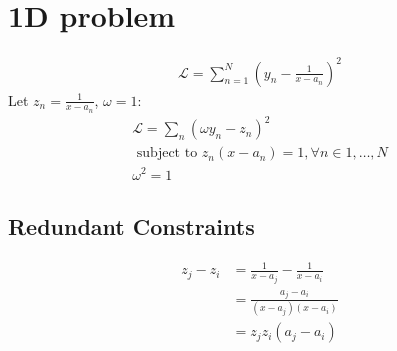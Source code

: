 \documentclass{article}
\begin{document}
\section{1D problem}


\begin{align}
    \mathcal{L} = \sum_{n = 1}^N \left( y_n - \frac{1}{x - a_n}\right)^2
\end{align}
Let $z_n = \frac{1}{x - a_n}$, $\omega = 1$:
\begin{align}
    \mathcal{L} = \sum_n \left( \omega y_n - z_n \right)^2 \\
    \text{ subject to }  z_n(x - a_n) = 1, \forall n \in {1, \dots, N} \\
    \omega^2 = 1
\end{align}


\subsection{Redundant Constraints}

\begin{align}
    z_j - z_i  &= \frac{1}{x - a_j} - \frac{1}{x - a_i}\\
    &= \frac{a_j - a_i}{(x - a_j)(x - a_i)} \\
    &= z_j z_i (a_j - a_i)
\end{align}
\end{document}
